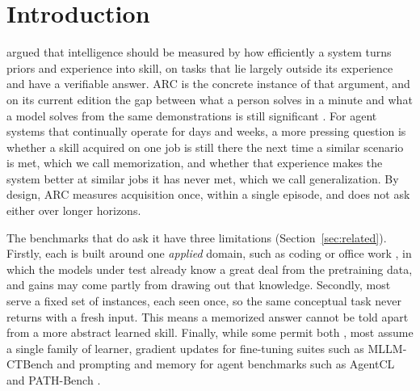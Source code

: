 \section{Introduction}

\citet{chollet2019measure} argued that intelligence should be measured by how efficiently a system turns priors and experience into skill, on tasks that lie largely outside its experience and have a verifiable answer. ARC is the concrete instance of that argument, and on its current edition the gap between what a person solves in a minute and what a model solves from the same demonstrations is still significant \citep{chollet2026arcprize2025}. For agent systems that continually operate for days and weeks, a more pressing question is whether a skill acquired on one job is still there the next time a similar scenario is met, which we call memorization, and whether that experience makes the system better at similar jobs it has never met, which we call generalization. By design, ARC measures acquisition once, within a single episode, and does not ask either over longer horizons.

The benchmarks that do ask it have three limitations (Section~\ref{sec:related}). Firstly, each is built around one \emph{applied} domain, such as coding or office work \citep{wu2024streambench,zheng2025lifelongagentbench,joshi2025swebenchcl}, in which the models under test already know a great deal from the pretraining data, and gains may come partly from drawing out that knowledge. Secondly, most serve a fixed set of instances, each seen once, so the same conceptual task never returns with a fresh input. This means a memorized answer cannot be told apart from a more abstract learned skill. Finally, while some permit both \citep{wu2024streambench,zheng2025lifelongagentbench}, most assume a single family of learner, gradient updates for fine-tuning suites such as MLLM-CTBench \citep{guo2025mllmctbench} and prompting and memory for agent benchmarks such as AgentCL and PATH-Bench \citep{shu2026agentcl,yang2026pathbench}.

